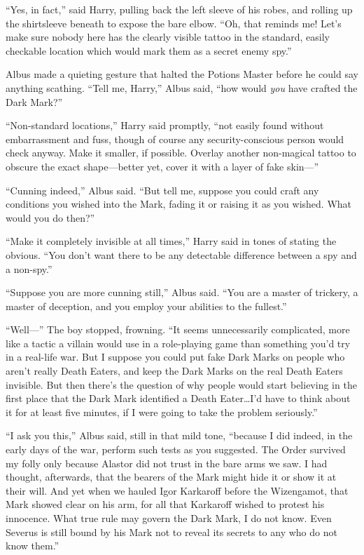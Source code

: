 “Yes, in fact,” said Harry, pulling back the left sleeve of his robes, and rolling up the shirtsleeve beneath to expose the bare elbow. “Oh, that reminds me! Let’s make sure nobody here has the clearly visible tattoo in the standard, easily checkable location which would mark them as a secret enemy spy.”

Albus made a quieting gesture that halted the Potions Master before he could say anything scathing. “Tell me, Harry,” Albus said, “how would \emph{you} have crafted the Dark Mark?”

“Non-standard locations,” Harry said promptly, “not easily found without embarrassment and fuss, though of course any security\hyp{}conscious person would check anyway. Make it smaller, if possible. Overlay another non-magical tattoo to obscure the exact shape—better yet, cover it with a layer of fake skin—”

“Cunning indeed,” Albus said. “But tell me, suppose you could craft any conditions you wished into the Mark, fading it or raising it as you wished. What would you do then?”

“Make it completely invisible at all times,” Harry said in tones of stating the obvious. “You don’t want there to be any detectable difference between a spy and a non-spy.”

“Suppose you are more cunning still,” Albus said. “You are a master of trickery, a master of deception, and you employ your abilities to the fullest.”

“Well—” The boy stopped, frowning. “It seems unnecessarily complicated, more like a tactic a villain would use in a role-playing game than something you’d try in a real-life war. But I suppose you could put fake Dark Marks on people who aren’t really Death Eaters, and keep the Dark Marks on the real Death Eaters invisible. But then there’s the question of why people would start believing in the first place that the Dark Mark identified a Death Eater…I’d have to think about it for at least five minutes, if I were going to take the problem seriously.”

“I ask you this,” Albus said, still in that mild tone, “because I did indeed, in the early days of the war, perform such tests as you suggested. The Order survived my folly only because Alastor did not trust in the bare arms we saw. I had thought, afterwards, that the bearers of the Mark might hide it or show it at their will. And yet when we hauled Igor Karkaroff before the Wizengamot, that Mark showed clear on his arm, for all that Karkaroff wished to protest his innocence. What true rule may govern the Dark Mark, I do not know. Even Severus is still bound by his Mark not to reveal its secrets to any who do not know them.”

